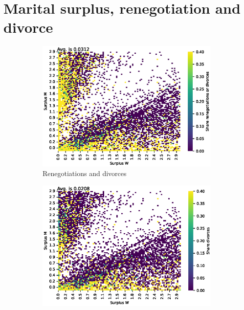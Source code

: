 \documentclass[]{article}
\begin{document}
\section{Marital surplus, renegotiation and divorce}





\begin{figure}[H]
	\centering
	\begin{subfigure}{0.49\textwidth} %
		\centering
		\includegraphics[width=\textwidth]{surp_ren_div.eps} %
		\caption{Renegotiations and divorces}
		\label{fig:picture1}
	\end{subfigure}
	\begin{subfigure}{0.49\textwidth}
		\centering
		\includegraphics[width=\textwidth]{surp_div.eps} %

\end{subfigure}
\end{figure}
\end{document}
